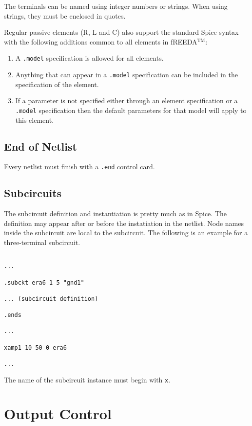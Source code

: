 The terminals can be named using integer numbers or strings. When
using strings, they must be enclosed in quotes.

Regular passive elements (R, L and C) also support the standard Spice
syntax with the following additions common to all elements in fREEDA$^{\mathrm{TM}}$:
\begin{enumerate}
\item A {\tt .model} specification is allowed for all elements.
\item Anything that can appear in a {\tt .model} specification can be
      included in the specification of the element.
\item If a parameter is not specified either through an  element
specification or a {\tt.model} specification then the default
parameters for that model will apply to this element.
\end{enumerate}

\subsection{End of Netlist}

Every netlist must finish with a {\tt .end} control card.


\subsection{Subcircuits}

The subcircuit definition and instantiation is pretty much as in
Spice. The definition may appear after or before the instatiation in
the netlist. Node names inside the subcircuit are local to the
subcircuit.  The following is an example for a three-terminal
subcircuit.
\begin{verbatim}

...

.subckt era6 1 5 "gnd1"

... (subcircuit definition)

.ends

...

xamp1 10 50 0 era6

...
\end{verbatim}
The name of the subcircuit instance must begin with {\tt x}.


\section{Output Control} \label{sec_output}

